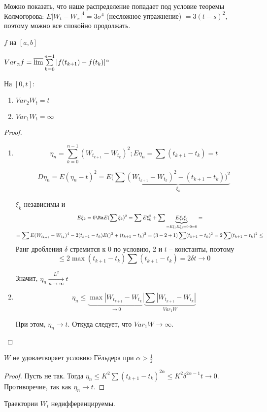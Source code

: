 Можно показать, что наше распределение попадает под условие теоремы Колмогорова: 
$E |W_t - W_x|^4 = 3\sigma^4$ (несложное упражнение) $ = 3(t - s)^2$, поэтому можно все спокойно продолжать.


\begin{Def}
$f$ на $[a, b]$

$Var_\alpha f = \varlimsup \sum\limits_{k=0}^{n-1} |f(t_{k+1}) - f(t_k)|^\alpha$
\end{Def}

\begin{theorem}
На $[0, t]$: 
\begin{enumerate}
\item $Var_2 W_t = t$
\item $Var_1 W_t = \infty$
\end{enumerate}
\end{theorem}
\begin{proof}
\begin{enumerate}
\item 
$$\eta_n = \sum\limits_{k=0}^{n-1} (W_{t_{k+1}} - W_{t_k})^2; E\eta_n = \sum(t_{k+1}-t_k) = t$$
                                                                                              
$$D\eta_n = E(\eta_n - t)^2 = E(\sum \underbrace{(W_{t_{k+1}} - W_{t_k})^2 - (t_{k+1} - t_k))^2}_{\xi_k}$$

$\xi_k$ независимы и 
\begin{gather*}
    E\xi_k = 0 \Ra E(\sum \xi_k)^2 = \sum E\xi_k^2 + \sum \underbrace{E\xi_i\xi_j}_{=E\xi_i E\xi_j = 0 \cdot 0 = 0} = \\
    = \sum E(W_{t_{k+1}} - W_{t_k})^4 - 2(t_{k+1} - t_k) E () ^2 + (t_{k+1} - t_k)^2 = (3 - 2 + 1) \sum (t_{k+1} - t_k)^2 = 2 \sum (t_{k+1} - t_k)^2 \leq
\end{gather*}
Ранг дробления $\delta$ стремится к 0 по условию, 2 и $t$ -- константы, поэтому
$$\leq 2 \max(t_{k+1} - t_k) \sum (t_{k+1} - t_k) = 2 \delta t \to 0$$

Значит, $\eta_n \xrightarrow[n \to \infty]{L^2} t$

\item
$$\eta_n \leq \underbrace{\max |W_{t_{k + 1}} - W_{t_k}|}_{\to 0} \underbrace{\sum |W_{t_{k+1}} - W_{t_k}|}_{Var_1 W}$$

При этом, $\eta_n \to t$. Откуда следует, что $Var_1 W \to \infty$.
\end{enumerate}
\end{proof}
\begin{conseq}
$W$ не удовлетворяет условию Гёльдера при $\alpha > \frac12$
\end{conseq}
\begin{proof}
Пусть не так. Тогда $\eta_n \leq K^2 \sum (t_{k+1} - t_k)^{2\alpha} \leq K^2 \delta^{2\alpha - 1} t \to 0$.
Противоречие, так как $\eta_n \to t$. 
\end{proof}
\begin{conseq}
Траектории $W_t$ недифференцируемы.
\end{conseq}

